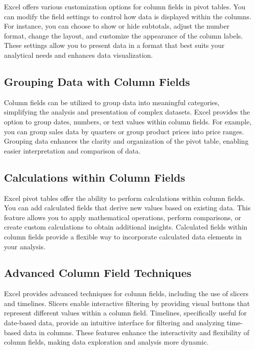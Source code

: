 \documentclass[
]{book}
\begin{document}
Excel offers various customization options for column fields in pivot tables. You can modify the field settings to control how data is displayed within the columns. For instance, you can choose to show or hide subtotals, adjust the number format, change the layout, and customize the appearance of the column labels. These settings allow you to present data in a format that best suits your analytical needs and enhances data visualization.

\hypertarget{grouping-data-with-column-fields}{%
\subsection{Grouping Data with Column Fields}\label{grouping-data-with-column-fields}}

Column fields can be utilized to group data into meaningful categories, simplifying the analysis and presentation of complex datasets. Excel provides the option to group dates, numbers, or text values within column fields. For example, you can group sales data by quarters or group product prices into price ranges. Grouping data enhances the clarity and organization of the pivot table, enabling easier interpretation and comparison of data.

\hypertarget{calculations-within-column-fields}{%
\subsection{Calculations within Column Fields}\label{calculations-within-column-fields}}

Excel pivot tables offer the ability to perform calculations within column fields. You can add calculated fields that derive new values based on existing data. This feature allows you to apply mathematical operations, perform comparisons, or create custom calculations to obtain additional insights. Calculated fields within column fields provide a flexible way to incorporate calculated data elements in your analysis.

\hypertarget{advanced-column-field-techniques}{%
\subsection{Advanced Column Field Techniques}\label{advanced-column-field-techniques}}

Excel provides advanced techniques for column fields, including the use of slicers and timelines. Slicers enable interactive filtering by providing visual buttons that represent different values within a column field. Timelines, specifically useful for date-based data, provide an intuitive interface for filtering and analyzing time-based data in columns. These features enhance the interactivity and flexibility of column fields, making data exploration and analysis more dynamic.
\end{document}
